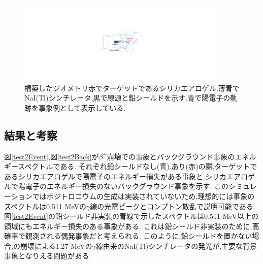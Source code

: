 \begin{figure}[!tbp]
	\centering
		\includegraphics[width=10cm]{img/test2_geometry.pdf}
	\caption[構築したジオメトリ]{構築したジオメトリ\newline 赤でターゲットであるシリカエアロゲル,薄青でNaI(Tl)シンチレータ,黒で線源と鉛シールドを示す.青で陽電子の軌跡を事象例として表示している.}
	\label{test2_geometry}
\end{figure}

\subsection{結果と考察}

図\ref{test2Event},図\ref{test2Back}が$\beta^+$崩壊での事象とバックグラウンド事象のエネルギースペクトルである.
それぞれ鉛シールドなし(青),あり(赤)の際,ターゲットであるシリカエアロゲルで陽電子のエネルギー損失がある事象と,シリカエアロゲルで陽電子のエネルギー損失のないバックグラウンド事象を示す.
このシミュレーションではポジトロニウムの生成は実装されていないため,理想的には事象のスペクトルは0.511 MeVの$\gamma$線の光電ピークとコンプトン散乱で説明可能である.
図\ref{test2Event}の鉛シールド非実装の青線で示したスペクトルは0.511 MeV以上の領域にもエネルギー損失のある事象がある.
これは鉛シールド非実装のために,高確率で観測される偶発事象だと考えられる.
このように,鉛シールドを置かない場合,の崩壊による1.27 MeVの$\gamma$線由来のNaI(Tl)シンチレータの発光が,主要な背景事象となりえる問題がある.

